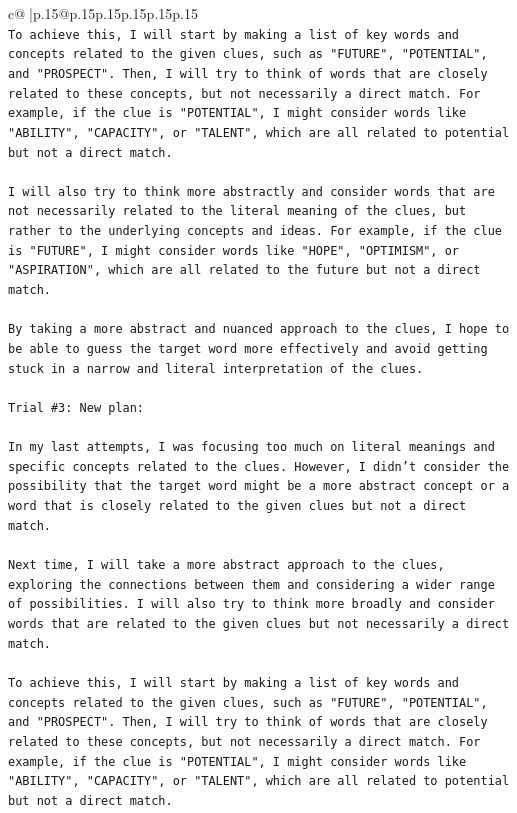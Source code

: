 \documentclass{article}
\begin{document}
{\begin{supertabular}{c@{$\;$}|p{.15\linewidth}@{}p{.15\linewidth}p{.15\linewidth}p{.15\linewidth}p{.15\linewidth}p{.15\linewidth}}
{{{\\ 
\texttt{To achieve this, I will start by making a list of key words and concepts related to the given clues, such as "FUTURE", "POTENTIAL", and "PROSPECT". Then, I will try to think of words that are closely related to these concepts, but not necessarily a direct match. For example, if the clue is "POTENTIAL", I might consider words like "ABILITY", "CAPACITY", or "TALENT", which are all related to potential but not a direct match.} \\
\\ 
\texttt{I will also try to think more abstractly and consider words that are not necessarily related to the literal meaning of the clues, but rather to the underlying concepts and ideas. For example, if the clue is "FUTURE", I might consider words like "HOPE", "OPTIMISM", or "ASPIRATION", which are all related to the future but not a direct match.} \\
\\ 
\texttt{By taking a more abstract and nuanced approach to the clues, I hope to be able to guess the target word more effectively and avoid getting stuck in a narrow and literal interpretation of the clues.} \\
\\ 
\texttt{Trial \#3: New plan: } \\
\\ 
\texttt{In my last attempts, I was focusing too much on literal meanings and specific concepts related to the clues. However, I didn't consider the possibility that the target word might be a more abstract concept or a word that is closely related to the given clues but not a direct match.} \\
\\ 
\texttt{Next time, I will take a more abstract approach to the clues, exploring the connections between them and considering a wider range of possibilities. I will also try to think more broadly and consider words that are related to the given clues but not necessarily a direct match.} \\
\\ 
\texttt{To achieve this, I will start by making a list of key words and concepts related to the given clues, such as "FUTURE", "POTENTIAL", and "PROSPECT". Then, I will try to think of words that are closely related to these concepts, but not necessarily a direct match. For example, if the clue is "POTENTIAL", I might consider words like "ABILITY", "CAPACITY", or "TALENT", which are all related to potential but not a direct match.} \\
}}}
\end{supertabular}}
\end{document}
